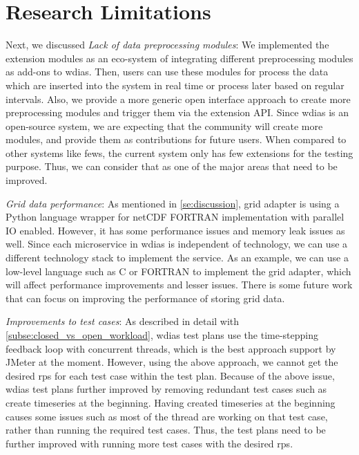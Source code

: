 \section{Research Limitations}
\label{se:research_limitations}

Next, we discussed \emph{Lack of data preprocessing modules}:
We implemented the extension modules as an eco-system of integrating different preprocessing modules as add-ons to \acrshort{wdias}. Then, users can use these modules for process the data which are inserted into the system in real time or process later based on regular intervals. Also, we provide a more generic open interface approach to create more preprocessing modules and trigger them via the extension API. Since \acrshort{wdias} is an open-source system, we are expecting that the community will create more modules, and provide them as contributions for future users. When compared to other systems like \acrshort{fews}, the current system only has few extensions for the testing purpose. Thus, we can consider that as one of the major areas that need to be improved.

\emph{Grid data performance}:
As mentioned in \cref{se:discussion}, grid adapter is using a Python language wrapper for netCDF FORTRAN implementation with parallel IO enabled. However, it has some performance issues and memory leak issues as well. Since each microservice in \acrshort{wdias} is independent of technology, we can use a different technology stack to implement the service. As an example, we can use a low-level language such as C or FORTRAN to implement the grid adapter, which will affect performance improvements and lesser issues. There is some future work that can focus on improving the performance of storing grid data.

\emph{Improvements to test cases}:
As described in detail with \cref{subse:closed_vs_open_workload}, \acrshort{wdias} test plans use the time-stepping feedback loop with concurrent threads, which is the best approach support by JMeter at the moment. However, using the above approach, we cannot get the desired \acrshort{rps} for each test case within the test plan.
Because of the above issue, \acrshort{wdias} test plans further improved by removing redundant test cases such as create timeseries at the beginning. Having created timeseries at the beginning causes some issues such as most of the thread are working on that test case, rather than running the required test cases. Thus, the test plans need to be further improved with running more test cases with the desired \acrshort{rps}.

